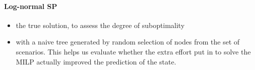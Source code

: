 \paragraph{Log-normal SP}

\begin{itemize}
\item the true solution, to assess the degree of suboptimality
\item with a naive tree generated by random selection of nodes from the set of scenarios. This helps us evaluate whether the extra effort put in to solve the MILP actually improved the prediction of the state.
\end{itemize}

